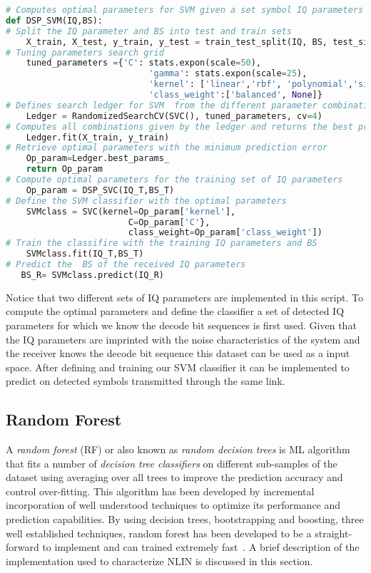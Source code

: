\begin{lstlisting}[language=Python, caption=SVM implementation in python where a optimal parameter function is defined and implemented to predict over a new set of detected IQ parameters.]
# Computes optimal parameters for SVM given a set symbol IQ parameters and the decoded bit sequence bit sequence (BS)
def DSP_SVM(IQ,BS):
# Split the IQ parameter and BS into test and train sets
    X_train, X_test, y_train, y_test = train_test_split(IQ, BS, test_size = 0.20)
# Tuning parameters search grid  
	tuned_parameters ={'C': stats.expon(scale=50),
							'gamma': stats.expon(scale=25),
							'kernel': ['linear','rbf', 'polynomial','sigmoid'],
							'class_weight':['balanced', None]}
# Defines search ledger for SVM  from the different parameter combinations 
    Ledger = RandomizedSearchCV(SVC(), tuned_parameters, cv=4)
# Computes all combinations given by the ledger and returns the best preforming parameters
    Ledger.fit(X_train, y_train)
# Retrieve optimal parameters with the minimum prediction error 
    Op_param=Ledger.best_params_
    return Op_param
# Compute optimal parameters for the training set of IQ parameters
	Op_param = DSP_SVC(IQ_T,BS_T)
# Define the SVM classifier with the optimal parameters
    SVMclass = SVC(kernel=Op_param['kernel'],
    					C=Op_param['C'},
    					class_weight=Op_param['class_weight'])
# Train the classifire with the training IQ parameters and BS      
    SVMclass.fit(IQ_T,BS_T)
# Predict the  BS of the received IQ parameters
   BS_R= SVMclass.predict(IQ_R)
\end{lstlisting}
 Notice that two different sets of IQ parameters are implemented in this script. To compute the optimal parameters and define the classifier a set of detected IQ parameters for which we know the decode bit sequences is first used. Given that the IQ parameters are imprinted with the noise  characteristics of the system and the receiver knows the decode bit sequence this dataset can be used as a input space. After defining and training our SVM classifier it can be implemented to predict on detected symbols transmitted through the same link. 
\subsection{Random Forest}

A \textit{random forest} (RF) or also known as \textit{random decision trees} is ML algorithm that fits a number of \textit{decision tree classifiers} on different sub-samples of the dataset using averaging over all trees to improve the prediction accuracy and control over-fitting. This algorithm has been developed by incremental incorporation of well understood techniques to optimize its performance and prediction capabilities. By using decision trees, bootstrapping and boosting, three well established techniques, random forest has been developed to be a straight-forward to implement and can trained extremely fast~\cite{ho1995random}. A brief description of the implementation used to characterize NLIN is discussed in this section.
 
